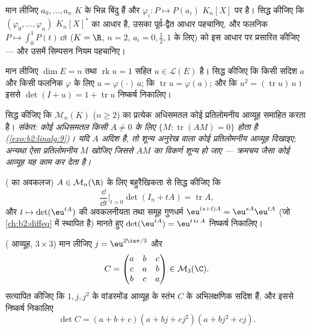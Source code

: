 \begin{exercise}[$\star\star$]\label{exo:b2:linalg:4}
मान लीजिए $a_0, \dots, a_n$ $K$ के भिन्न बिंदु हैं और $\varphi_i \colon
P \mapsto P(a_i)$ $K_n[X]$ पर है। सिद्ध कीजिए कि
$(\varphi_0, \dots,
\varphi_n)$ $K_n[X]^*$ का आधार है, उसका पूर्व-द्वैत आधार पहचानिए, और फलनिक $P \mapsto \int_0^1 P(t)\,\dd t$ ($K = \R$,
$n = 2$, $a_i = 0, \frac12, 1$ के लिए) को इस आधार पर प्रसारित कीजिए --- और उसमें सिम्पसन
नियम पहचानिए।
\end{exercise}

\begin{exercise}[$\star\star$]\label{exo:b2:linalg:5}
मान लीजिए $\dim E = n$ तथा $\operatorname{rk} u
= 1$ सहित $u \in \mathcal{L}(E)$ है। सिद्ध कीजिए कि किसी सदिश $a$ और
किसी फलनिक $\varphi$ के लिए $u = \varphi(\cdot)\, a$; कि $\operatorname{tr} u = \varphi(a)$; और कि $u^2 = (\operatorname{tr} u)\, u$। इससे $\det(I + u) = 1 +
\operatorname{tr} u$ निष्कर्ष
निकालिए।
\end{exercise}

\begin{exercise}[$\star\star$]\label{exo:b2:linalg:6}
सिद्ध कीजिए कि $\mathcal{M}_n(K)$ ($n \geq 2$) का प्रत्येक अधिसमतल कोई प्रतिलोमनीय आव्यूह
समाहित करता है। \emph{संकेत: कोई अधिसमतल किसी $A \neq 0$ के लिए $\{M :
\operatorname{tr}(AM) = 0\}$ होता है
(\cref{exo:b2:linalg:9})। यदि $A$ अदिश है, तो शून्य अनुरेख वाला कोई प्रतिलोमनीय आव्यूह
दिखाइए; अन्यथा ऐसा प्रतिलोमनीय $M$ खोजिए जिससे $AM$ का विकर्ण शून्य हो
जाए --- क्रमचय जैसा कोई आव्यूह यह काम कर देता है।}
\end{exercise}

\begin{exercise}[$\star\star$]\label{exo:b2:linalg:7}
( का अवकलज) $A \in \mathcal{M}_n(\R)$ के लिए बहुरैखिकता से सिद्ध कीजिए कि
\[
\frac{\dd}{\dd t}\Big|_{t=0} \det(I_n + tA) = \operatorname{tr} A ,
\]
और $t \mapsto \det(\eu^{tA})$ की अवकलनीयता तथा समूह गुणधर्म $\eu^{(s+t)A} = \eu^{sA}\eu^{tA}$ (जो \cref{ch:b2:diffeq} में स्थापित है) मानते
हुए $\det(\eu^{tA}) = \eu^{t\operatorname{tr} A}$ निष्कर्ष निकालिए।
\end{exercise}

\begin{exercise}[$\star\star$]\label{exo:b2:linalg:8}
( आव्यूह, $3 \times 3$) मान लीजिए $j = \eu^{2\iu\pi/3}$ और
\[
C = \begin{pmatrix}
a & b & c\\
c & a & b\\
b & c & a
\end{pmatrix} \in \mathcal{M}_3(\C).
\]
सत्यापित कीजिए कि $1, j, j^2$ के वांडरमोंड आव्यूह के स्तंभ $C$ के अभिलक्षणिक
सदिश हैं, और इससे निष्कर्ष निकालिए
\[
\det C = (a + b + c)(a + bj + cj^2)(a + bj^2 + cj).
\]
\end{exercise}

